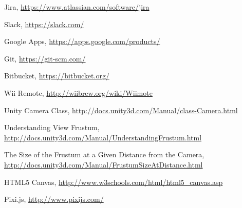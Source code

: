 \documentclass[a4paper,11pt]{article}
\begin{document}
\begin{thebibliography}{9}

	Jira,
    \url{https://www.atlassian.com/software/jira}
    
	Slack,
    \url{https://slack.com/}
    
	Google Apps,
    \url{https://apps.google.com/products/}
    
	Git,
    \url{https://git-scm.com/}
    
	Bitbucket,
    \url{https://bitbucket.org/}

  Wii Remote,
  \url{http://wiibrew.org/wiki/Wiimote}

  Unity Camera Class,
  \url{http://docs.unity3d.com/Manual/class-Camera.html}
  
  Understanding View Frustum,
  \url{http://docs.unity3d.com/Manual/UnderstandingFrustum.html}

  The Size of the Frustum at a Given Distance from the Camera,
  \url{http://docs.unity3d.com/Manual/FrustumSizeAtDistance.html}

  HTML5 Canvas,
  \url{http://www.w3schools.com/html/html5_canvas.asp}

  Pixi.js,
  \url{http://www.pixijs.com/}

\end{thebibliography}
\end{document}
